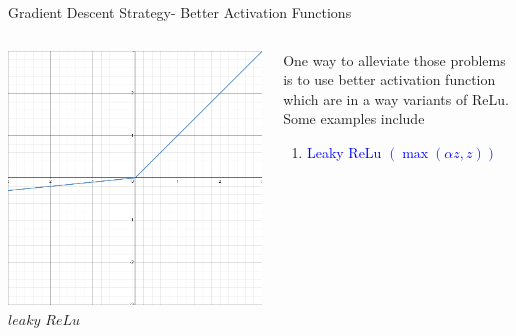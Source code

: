 \begin{frame}{Gradient Descent Strategy- Better Activation Functions}
	\begin{columns}[T]
        \begin{column}{0.5\textwidth}
        	\includegraphics[width=\textwidth]{images/LeakyRelu.png}
        	\tiny{\textit{$leaky$ $ReLu$}}
        \end{column}
	    \begin{column}{0.5\textwidth}
    	    One way to alleviate those problems is to use better activation function which are in a way variants of ReLu. Some examples include 
			\begin{enumerate}[$\bullet$]
				\item \textcolor{blue}{Leaky ReLu $\left(\max(\alpha z,z)\right)$}
			\end{enumerate}
    	\end{column}
    \end{columns}
\end{frame}



